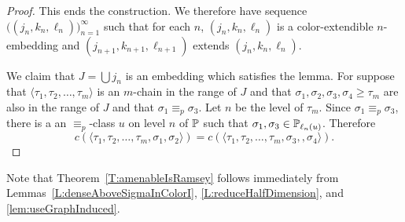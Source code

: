 \begin{proof}
This ends the construction.
We therefore have sequence $\big((j_n,k_n,\ell_n)\big)_{n=1}^\infty$
such that for each $n$, $(j_n,k_n,\ell_n)$ is a color-extendible $n$-embedding
and $(j_{n+1},k_{n+1},\ell_{n+1})$ extends $(j_n,k_n,\ell_n)$.

We claim that $J=\bigcup j_n$ is an embedding which satisfies the lemma.
For suppose that $\langle\tau_1,\tau_2,\ldots,\tau_m\rangle$ is an $m$-chain
in the range of $J$ and that $\sigma_1,\sigma_2,\sigma_3,\sigma_4\geq\tau_m$ are also in the
range of $J$ and that $\sigma_1\equiv_p\sigma_3$.
Let $n$ be the level of $\tau_m$.
Since $\sigma_1\equiv_p\sigma_3$, there is a an $\equiv_p$-class
$u$ on level $n$ of $\mathbb{P}$ such that $\sigma_1,\sigma_3\in\mathbb{P}_{\ell_n(u)}$.
Therefore
$$c(\langle\tau_1,\tau_2,\ldots,\tau_m,\sigma_1,\sigma_2\rangle)=c(\langle\tau_1,\tau_2,\ldots,\tau_m,\sigma_3,,\sigma_4\rangle).$$
\end{proof}

Note that Theorem~\ref{T:amenableIsRamsey} follows immediately from
Lemmas~\ref{L:denseAboveSigmaInColorI}, \ref{L:reduceHalfDimension}, and \ref{lem:useGraphInduced}.
